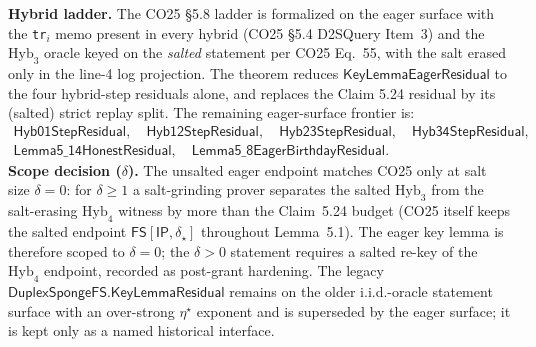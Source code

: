 \begin{remark}
    \textbf{Hybrid ladder.} The CO25 \S5.8 ladder is formalized on the eager surface with
    the \texttt{tr}$_i$ memo present in every hybrid (CO25 \S5.4 D2SQuery Item~3) and the
    $\mathrm{Hyb}_3$ oracle keyed on the \emph{salted} statement per CO25 Eq.~55, with the
    salt erased only in the line-4 log projection. The theorem
     reduces
    \(\mathsf{KeyLemmaEagerResidual}\) to the four hybrid-step residuals alone, and
     replaces the
    Claim 5.24 residual by its (salted) strict replay split. The remaining eager-surface
    frontier is:
    \[
    \begin{gathered}
    \mathsf{Hyb01StepResidual},\quad
    \mathsf{Hyb12StepResidual},\quad
    \mathsf{Hyb23StepResidual},\quad
    \mathsf{Hyb34StepResidual},\\
    \mathsf{Lemma5\_14HonestResidual},\quad
    \mathsf{Lemma5\_8EagerBirthdayResidual}.
    \end{gathered}
    \]
    \textbf{Scope decision ($\delta$).} The unsalted eager endpoint matches CO25 only at
    salt size $\delta = 0$: for $\delta \ge 1$ a salt-grinding prover separates the salted
    $\mathrm{Hyb}_3$ from the salt-erasing $\mathrm{Hyb}_4$ witness by more than the
    Claim~5.24 budget (CO25 itself keeps the salted endpoint $\mathsf{FS}[\mathsf{IP},
    \delta_\star]$ throughout Lemma~5.1). The eager key lemma is therefore scoped to
    $\delta = 0$; the $\delta > 0$ statement requires a salted re-key of the
    $\mathrm{Hyb}_4$ endpoint, recorded as post-grant hardening. The legacy
    \(\mathsf{DuplexSpongeFS.KeyLemmaResidual}\) remains on the older i.i.d.-oracle
    statement surface with an over-strong \(\eta^\star\) exponent and is superseded by the
    eager surface; it is kept only as a named historical interface.
\end{remark}
